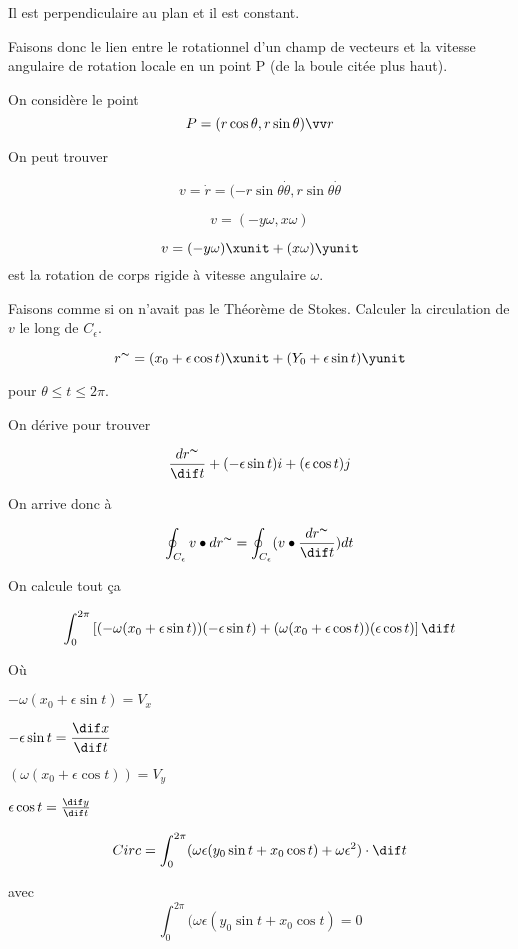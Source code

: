 Il est perpendiculaire au plan et il est constant.

Faisons donc le lien entre le rotationnel d'un champ de vecteurs et la vitesse angulaire de rotation locale en un point P (de la boule citée plus haut).

On considère le point
\[P = ( r \cos \theta, r \sin \theta ) \vv r \]

On peut trouver

\[ v = \dot{r} = (-r\sin \theta \dot{\theta}, r\sin \theta \dot{\theta}\] %

\[v = (-y \omega , x \omega) \]

\[v=(-y\omega) \xunit + (x\omega) \yunit \] est la rotation de corps rigide à vitesse angulaire $\omega$.

Faisons comme si on n'avait pas le Théorème de Stokes. Calculer la circulation de $v$ le long de $C_{\epsilon}$.

$$r^{\thicksim} = (x_0+ \epsilon \cos t ) \xunit +( Y_0 + \epsilon \sin t )\yunit $$

pour $\theta \le t \le 2 \pi$.

On dérive pour trouver

\[\frac{d r^{\thicksim} }{\dif t} + ( -\epsilon \sin t ) i + ( \epsilon \cos t ) j\]

On arrive donc à

\[\oint_{C_{\epsilon}} v \bullet dr^{\thicksim} = \oint_{C_{\epsilon}} ( v \bullet \frac{dr^{\thicksim}}{\dif t} ) dt \]


On calcule tout ça

\[\int_0^{2\pi} \left[ (-\omega ( x_0 + \epsilon \sin t )) ( - \epsilon \sin t ) + (\omega ( x_0 + \epsilon \cos t))( \epsilon \cos t ) \right] \dif t \]

Où

$-\omega ( x_0 + \epsilon \sin t ) = V_x$



$- \epsilon \sin t  = \dfrac{\dif x}{\dif t}$



$(\omega ( x_0 + \epsilon \cos t)) = V_y$




$\epsilon \cos t =\frac{\dif y}{\dif t}$




\[Circ = \int_0^{2\pi} (\omega \epsilon ( y_0 \sin t + x_0 \cos t ) + \omega \epsilon ^2 )\cdot \dif t \]

avec \[ \int_0^{2\pi} (\omega \epsilon ( y_0 \sin t + x_0 \cos t )  = 0\]


